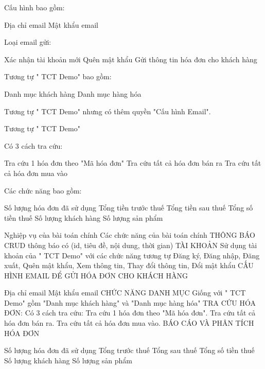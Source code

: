 
Cấu hình bao gồm:

Địa chỉ email
Mật khẩu email

Loại email gửi:

Xác nhận tài khoản mới
Quên mật khẩu
Gửi thông tin hóa đơn cho khách hàng


Tương tự " TCT Demo" bao gồm:

Danh mục khách hàng
Danh mục hàng hóa


Tương tự " TCT Demo" nhưng có thêm quyền "Cấu hình Email".


Tương tự " TCT Demo"


Có 3 cách tra cứu:

Tra cứu 1 hóa đơn theo "Mã hóa đơn"
Tra cứu tất cả hóa đơn bán ra
Tra cứu tất cả hóa đơn mua vào


Các chức năng bao gồm:

Số lượng hóa đơn đã sử dụng
Tổng tiền trước thuế
Tổng tiền sau thuế
Tổng số tiền thuế
Số lượng khách hàng
Số lượng sản phẩm


Nghiệp vụ của bài toán chính
Các chức năng của bài toán chính
THÔNG BÁO
CRUD thông báo có (id, tiêu đề, nội dung, thời gian)
TÀI KHOẢN
Sử dụng tài khoản của " TCT Demo" với các chức năng tương tự Đăng ký, Đăng nhập, Đăng xuất, Quên mật khẩu, Xem thông tin, Thay đổi thông tin, Đổi mật khẩu
CẤU HÌNH EMAIL ĐỂ GỬI HÓA ĐƠN CHO KHÁCH HÀNG

Địa chỉ email
Mật khẩu email
CHỨC NĂNG DANH MỤC
Giống với " TCT Demo" gồm "Danh mục khách hàng" và "Danh mục hàng hóa"
TRA CỨU HÓA ĐƠN:
Có 3 cách tra cứu:
Tra cứu 1 hóa đơn theo "Mã hóa đơn".
Tra cứu tất cả hóa đơn bán ra.
Tra cứu tất cả hóa đơn mua vào.
BÁO CÁO VÀ PHÂN TÍCH HÓA ĐƠN

Số lượng hóa đơn đã sử dụng
Tổng trước thuế
Tổng sau thuế
Tổng số tiền thuế
Số lượng khách hàng
Số lượng sản phẩm






